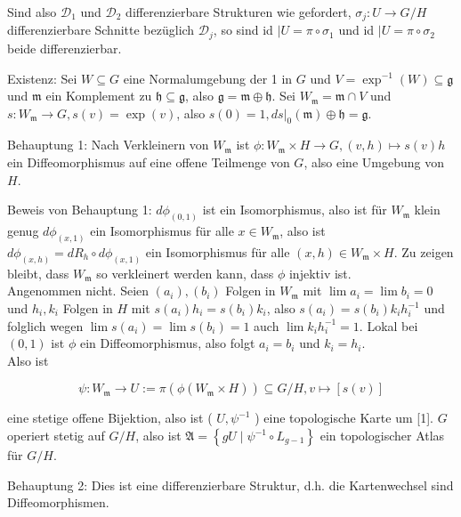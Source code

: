 \documentclass[10pt, letterpaper]{article}
\begin{document}
Sind also $\mathcal{D}_{1}$ und $\mathcal{D}_{2}$ differenzierbare Strukturen wie gefordert, $\sigma_{j}: U \rightarrow G / H$ differenzierbare Schnitte bezüglich $\mathcal{D}_{j}$, so sind id $\mid U=\pi \circ \sigma_{1}$ und id $\mid U=\pi \circ \sigma_{2}$ beide differenzierbar.

Existenz: Sei $W \subseteq G$ eine Normalumgebung der 1 in $G$ und $V=\exp ^{-1}(W) \subseteq \mathfrak{g}$ und $\mathfrak{m}$ ein Komplement zu $\mathfrak{h} \subseteq \mathfrak{g}$, also $\mathfrak{g}=\mathfrak{m} \oplus \mathfrak{h}$. Sei $W_{\mathfrak{m}}=\mathfrak{m} \cap V$ und $s: W_{\mathfrak{m}} \rightarrow G, s(v)=\exp (v)$, also $s(0)=1,\left.d s\right|_{0}(\mathfrak{m}) \oplus \mathfrak{h}=\mathfrak{g}$.

Behauptung 1: Nach Verkleinern von $W_{\mathfrak{m}}$ ist $\phi: W_{\mathfrak{m}} \times H \rightarrow G,(v, h) \mapsto s(v) h$ ein Diffeomorphismus auf eine offene Teilmenge von $G$, also eine Umgebung von $H$.

Beweis von Behauptung 1: $d \phi_{(0,1)}$ ist ein Isomorphismus, also ist für $W_{\mathfrak{m}}$ klein genug $d \phi_{(x, 1)}$ ein Isomorphismus für alle $x \in W_{\mathfrak{m}}$, also ist $d \phi_{(x, h)}=d R_{h} \circ d \phi_{(x, 1)}$ ein Isomorphismus für alle $(x, h) \in W_{\mathfrak{m}} \times H$. Zu zeigen bleibt, dass $W_{\mathfrak{m}}$ so verkleinert werden kann, dass $\phi$ injektiv ist.\\
Angenommen nicht. Seien $\left(a_{i}\right),\left(b_{i}\right)$ Folgen in $W_{\mathfrak{m}}$ mit $\lim a_{i}=\lim b_{i}=0$ und $h_{i}, k_{i}$ Folgen in $H$ mit $s\left(a_{i}\right) h_{i}=s\left(b_{i}\right) k_{i}$, also $s\left(a_{i}\right)=s\left(b_{i}\right) k_{i} h_{i}^{-1}$ und folglich wegen $\lim s\left(a_{i}\right)=\lim s\left(b_{i}\right)=1$ auch $\lim k_{i} h_{i}^{-1}=1$. Lokal bei $(0,1)$ ist $\phi$ ein Diffeomorphismus, also folgt $a_{i}=b_{i}$ und $k_{i}=h_{i}$.\\
Also ist

$$
\psi: W_{\mathfrak{m}} \rightarrow U:=\pi\left(\phi\left(W_{\mathfrak{m}} \times H\right)\right) \subseteq G / H, v \mapsto[s(v)]
$$

eine stetige offene Bijektion, also ist ( $U, \psi^{-1}$ ) eine topologische Karte um [1]. $G$ operiert stetig auf $G / H$, also ist $\mathfrak{A}=\left\{g U \mid \psi^{-1} \circ L_{g-1}\right\}$ ein topologischer Atlas für $G / H$.

Behauptung 2: Dies ist eine differenzierbare Struktur, d.h. die Kartenwechsel sind Diffeomorphismen.
\end{document}
